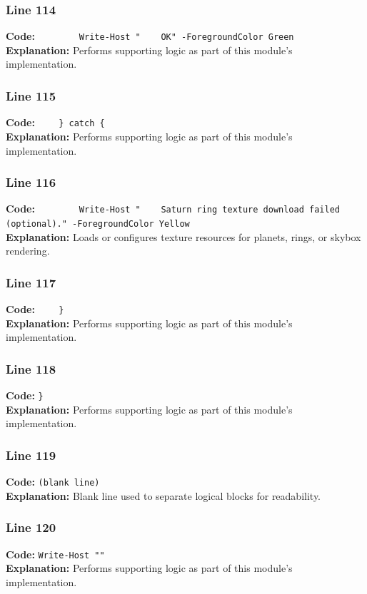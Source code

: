 \documentclass[11pt,a4paper]{article}
\begin{document}
\subsubsection*{Line 114}
\textbf{Code:} \verb|        Write-Host "    OK" -ForegroundColor Green|\\
\textbf{Explanation:} Performs supporting logic as part of this module's implementation.

\subsubsection*{Line 115}
\textbf{Code:} \verb|    } catch {|\\
\textbf{Explanation:} Performs supporting logic as part of this module's implementation.

\subsubsection*{Line 116}
\textbf{Code:} \verb|        Write-Host "    Saturn ring texture download failed (optional)." -ForegroundColor Yellow|\\
\textbf{Explanation:} Loads or configures texture resources for planets, rings, or skybox rendering.

\subsubsection*{Line 117}
\textbf{Code:} \verb|    }|\\
\textbf{Explanation:} Performs supporting logic as part of this module's implementation.

\subsubsection*{Line 118}
\textbf{Code:} \verb|}|\\
\textbf{Explanation:} Performs supporting logic as part of this module's implementation.

\subsubsection*{Line 119}
\textbf{Code:} \texttt{(blank line)}\\
\textbf{Explanation:} Blank line used to separate logical blocks for readability.

\subsubsection*{Line 120}
\textbf{Code:} \verb|Write-Host ""|\\
\textbf{Explanation:} Performs supporting logic as part of this module's implementation.
\end{document}
